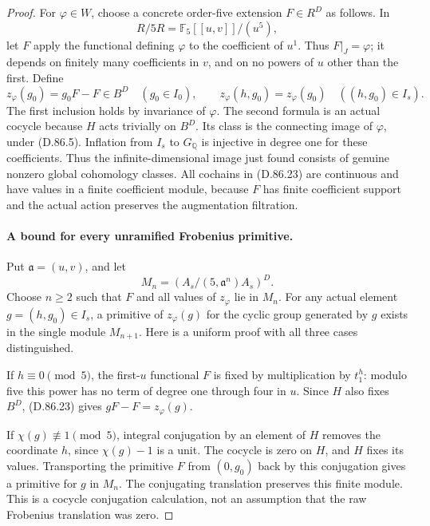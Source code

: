\begin{proof}
For \(\varphi\in W\), choose a concrete order-five extension
\(F\in R^D\) as follows. In
\[
                  R/5R=\mathbb F_5[[u,v]]/(u^5),
\]
let \(F\) apply the functional defining \(\varphi\) to the
coefficient of \(u^1\). Thus \(F|_J=\varphi\); it depends
on finitely many coefficients in \(v\), and on no powers
of \(u\) other than the first. Define
\[
 z_\varphi(g_0)=g_0F-F\in B^D\quad(g_0\in I_0),
 \qquad z_\varphi(h,g_0)=z_\varphi(g_0)\quad((h,g_0)\in I_s).
                                                               \tag{D.86.23}
\]
The first inclusion holds by invariance of \(\varphi\).
The second formula is an actual cocycle because \(H\)
acts trivially on \(B^D\). Its class is the connecting
image of \(\varphi\), under (D.86.5). Inflation from
\(I_s\) to \(G_{\mathbb Q}\) is injective in degree one
for these coefficients. Thus the infinite-dimensional image
just found consists of genuine nonzero global cohomology
classes. All cochains in (D.86.23) are continuous and have
values in a finite coefficient module, because \(F\) has
finite coefficient support and the actual action preserves
the augmentation filtration.

\paragraph{A bound for every unramified Frobenius primitive.}
Put \(\mathfrak a=(u,v)\), and let
\[
              M_n=(A_s/(5,\mathfrak a^n)A_s)^D.
\]
Choose \(n\ge2\) such that \(F\) and all values of
\(z_\varphi\) lie in \(M_n\). For any actual element
\(g=(h,g_0)\in I_s\), a primitive of
\(z_\varphi(g)\) for the cyclic group generated by \(g\)
exists in the single module \(M_{n+1}\). Here is a uniform
proof with all three cases distinguished.

If \(h\equiv0\pmod5\), the first-\(u\) functional \(F\)
is fixed by multiplication by \(t_1^h\): modulo five this
power has no term of degree one through four in \(u\).
Since \(H\) also fixes \(B^D\), (D.86.23) gives
\(gF-F=z_\varphi(g)\).

If \(\chi(g)\not\equiv1\pmod5\), integral conjugation
by an element of \(H\) removes the coordinate \(h\),
since \(\chi(g)-1\) is a unit. The cocycle is zero on
\(H\), and \(H\) fixes its values. Transporting the
primitive \(F\) from \((0,g_0)\) back by this conjugation
gives a primitive for \(g\) in \(M_n\). The conjugating
translation preserves this finite module. This is a
cocycle conjugation calculation, not an assumption that
the raw Frobenius translation was zero.


\end{proof}
